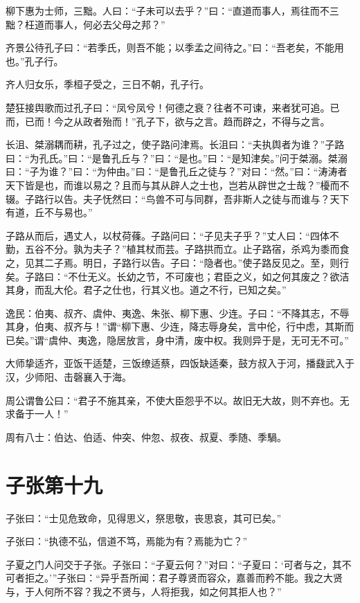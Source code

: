 \documentclass[twoside,openany]{book}
\begin{document}
柳下惠为士师，三黜。人曰：“子未可以去乎？”曰：“直道而事人，焉往而不三黜？枉道而事人，何必去父母之邦？”

齐景公待孔子曰：“若季氏，则吾不能；以季孟之间待之。”曰：“吾老矣，不能用也。”孔子行。

齐人归女乐，季桓子受之，三日不朝，孔子行。

楚狂接舆歌而过孔子曰：“凤兮凤兮！何德之衰？往者不可谏，来者犹可追。已而，已而！今之从政者殆而！”孔子下，欲与之言。趋而辟之，不得与之言。

长沮、桀溺耦而耕，孔子过之，使子路问津焉。长沮曰：“夫执舆者为谁？”子路曰：“为孔氏。”曰：“是鲁孔丘与？”曰：“是也。”曰：“是知津矣。”问于桀溺。桀溺曰：“子为谁？”曰：“为仲由。”曰：“是鲁孔丘之徒与？”对曰：“然。”曰：“涛涛者天下皆是也，而谁以易之？且而与其从辟人之士也，岂若从辟世之士哉？”櫌而不辍。子路行以告。夫子怃然曰：“鸟兽不可与同群，吾非斯人之徒与而谁与？天下有道，丘不与易也。”

子路从而后，遇丈人，以杖荷蓧。子路问曰：“子见夫子乎？”丈人曰：“四体不勤，五谷不分。孰为夫子？”植其杖而芸。子路拱而立。止子路宿，杀鸡为黍而食之，见其二子焉。明日，子路行以告。子曰：“隐者也。”使子路反见之。至，则行矣。子路曰：“不仕无义。长幼之节，不可废也；君臣之义，如之何其废之？欲洁其身，而乱大伦。君子之仕也，行其义也。道之不行，已知之矣。”

逸民：伯夷、叔齐、虞仲、夷逸、朱张、柳下惠、少连。子曰：“不降其志，不辱其身，伯夷、叔齐与！”谓“柳下惠、少连，降志辱身矣，言中伦，行中虑，其斯而已矣。”谓“虞仲、夷逸，隐居放言，身中清，废中权。我则异于是，无可无不可。”

大师挚适齐，亚饭干适楚，三饭缭适蔡，四饭缺适秦，鼓方叔入于河，播鼗武入于汉，少师阳、击磬襄入于海。

周公谓鲁公曰：“君子不施其亲，不使大臣怨乎不以。故旧无大故，则不弃也。无求备于一人！”

周有八士：伯达、伯适、仲突、仲忽、叔夜、叔夏、季随、季騧。


\chapter{子张第十九}\label{ch19}



子张曰：“士见危致命，见得思义，祭思敬，丧思哀，其可已矣。”

子张曰：“执德不弘，信道不笃，焉能为有？焉能为亡？”

子夏之门人问交于子张。子张曰：“子夏云何？”对曰：“子夏曰：‘可者与之，其不可者拒之。’”子张曰：“异乎吾所闻：君子尊贤而容众，嘉善而矜不能。我之大贤与，于人何所不容？我之不贤与，人将拒我，如之何其拒人也？”
\end{document}
